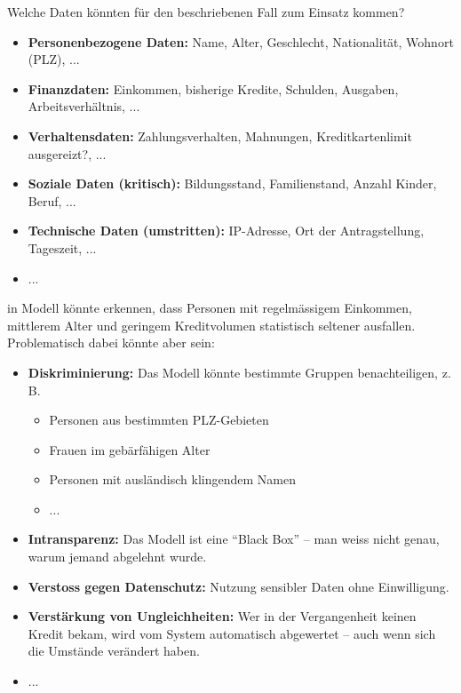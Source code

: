 \begin{aufgabe}{1}

Welche Daten könnten für den beschriebenen Fall zum Einsatz kommen?

\begin{itemize}
  \item \textbf{Personenbezogene Daten:} Name, Alter, Geschlecht, Nationalität, Wohnort (PLZ), ...
  \item \textbf{Finanzdaten:} Einkommen, bisherige Kredite, Schulden, Ausgaben, Arbeitsverhältnis, ...
  \item \textbf{Verhaltensdaten:} Zahlungsverhalten, Mahnungen, Kreditkartenlimit ausgereizt?, ...
  \item \textbf{Soziale Daten (kritisch):} Bildungsstand, Familienstand, Anzahl Kinder, Beruf, ...
  \item \textbf{Technische Daten (umstritten):} IP-Adresse, Ort der Antragstellung, Tageszeit, ...
  \item ...
\end{itemize}

in Modell könnte erkennen, dass Personen mit regelmässigem Einkommen, mittlerem Alter und geringem Kreditvolumen statistisch seltener ausfallen. Problematisch dabei könnte aber sein:

\begin{itemize}
  \item \textbf{Diskriminierung:} Das Modell könnte bestimmte Gruppen benachteiligen, z.\,B.\:
  \begin{itemize}
    \item Personen aus bestimmten PLZ-Gebieten
    \item Frauen im gebärfähigen Alter
    \item Personen mit ausländisch klingendem Namen
    \item ...
  \end{itemize}

  \item \textbf{Intransparenz:} Das Modell ist eine ``Black Box'' – man weiss nicht genau, warum jemand abgelehnt wurde.

  \item \textbf{Verstoss gegen Datenschutz:} Nutzung sensibler Daten ohne Einwilligung.

  \item \textbf{Verstärkung von Ungleichheiten:} Wer in der Vergangenheit keinen Kredit bekam, wird vom System automatisch abgewertet – auch wenn sich die Umstände verändert haben.
  \item ...


\end{itemize}
\end{aufgabe}

